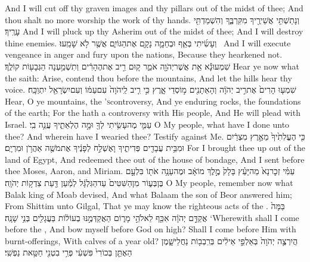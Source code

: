 {And I will cut off thy graven images and thy pillars out of the midst of thee; And thou shalt no more worship the work of thy hands.}
{וְנָתַשְׁתִּ֥י אֲשֵׁירֶ֖יךָ מִקִּרְבֶּ֑ךָ וְהִשְׁמַדְתִּ֖י עָרֶֽיךָ׃}
{And I will pluck up thy Asherim out of the midst of thee; And I will destroy thine enemies.}
{וְעָשִׂ֜יתִי בְּאַ֧ף וּבְחֵמָ֛ה נָקָ֖ם אֶת\maqqaf הַגּוֹיִ֑ם אֲשֶׁ֖ר לֹ֥א שָׁמֵֽעוּ׃ \petucha }
{And I will execute vengeance in anger and fury upon the nations, Because they hearkened not.}
\newperek
{}
{שִׁמְעוּ\maqqaf נָ֕א אֵ֥ת אֲשֶׁר\maqqaf יְהֹוָ֖ה אֹמֵ֑ר ק֚וּם רִ֣יב אֶת\maqqaf הֶהָרִ֔ים וְתִשְׁמַ֥עְנָה הַגְּבָע֖וֹת קוֹלֶֽךָ׃}
{Hear ye now what the \lord\space saith: Arise, contend thou before the mountains, And let the hills hear thy voice.}
{שִׁמְע֤וּ הָרִים֙ אֶת\maqqaf רִ֣יב יְהֹוָ֔ה וְהָאֵתָנִ֖ים מ֣וֹסְדֵי אָ֑רֶץ כִּ֣י רִ֤יב לַֽיהֹוָה֙ עִם\maqqaf עַמּ֔וֹ וְעִם\maqqaf יִשְׂרָאֵ֖ל יִתְוַכָּֽח׃}
{Hear, O ye mountains, the \lord\textsc{’s}\space controversy, And ye enduring rocks, the foundations of the earth; For the \lord\space hath a controversy with His people, And He will plead with Israel.}
{עַמִּ֛י מֶה\maqqaf עָשִׂ֥יתִי לְךָ֖ וּמָ֣ה הֶלְאֵתִ֑יךָ עֲנֵ֥ה בִֽי׃}
{O My people, what have I done unto thee? And wherein have I wearied thee? Testify against Me.}
{כִּ֤י הֶעֱלִתִ֙יךָ֙ מֵאֶ֣רֶץ מִצְרַ֔יִם וּמִבֵּ֥ית עֲבָדִ֖ים פְּדִיתִ֑יךָ וָאֶשְׁלַ֣ח לְפָנֶ֔יךָ אֶת\maqqaf מֹשֶׁ֖ה אַהֲרֹ֥ן וּמִרְיָֽם׃}
{For I brought thee up out of the land of Egypt, And redeemed thee out of the house of bondage, And I sent before thee Moses, Aaron, and Miriam.}
{עַמִּ֗י זְכׇר\maqqaf נָא֙ מַה\maqqaf יָּעַ֗ץ בָּלָק֙ מֶ֣לֶךְ מוֹאָ֔ב וּמֶה\maqqaf עָנָ֥ה אֹת֖וֹ בִּלְעָ֣ם בֶּן\maqqaf בְּע֑וֹר מִן\maqqaf הַשִּׁטִּים֙ עַד\maqqaf הַגִּלְגָּ֔ל לְמַ֕עַן דַּ֖עַת צִדְק֥וֹת יְהֹוָֽה׃}
{O My people, remember now what Balak king of Moab devised, And what Balaam the son of Beor answered him; From Shittim unto Gilgal, That ye may know the righteous acts of the \lord.}
{בַּמָּה֙ אֲקַדֵּ֣ם יְהֹוָ֔ה אִכַּ֖ף לֵאלֹהֵ֣י מָר֑וֹם הַאֲקַדְּמֶ֣נּוּ בְעוֹל֔וֹת בַּעֲגָלִ֖ים בְּנֵ֥י שָׁנָֽה׃}
{‘Wherewith shall I come before the \lord, And bow myself before God on high? Shall I come before Him with burnt-offerings, With calves of a year old?}
{הֲיִרְצֶ֤ה יְהֹוָה֙ בְּאַלְפֵ֣י אֵילִ֔ים בְּרִֽבְב֖וֹת נַחֲלֵי\maqqaf שָׁ֑מֶן הַאֶתֵּ֤ן בְּכוֹרִי֙ פִּשְׁעִ֔י פְּרִ֥י בִטְנִ֖י חַטַּ֥את נַפְשִֽׁי׃}
